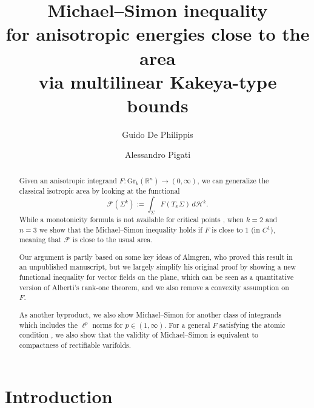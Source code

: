\documentclass[11pt,a4paper]{amsart}
\newcommand{\R}{\mathbb{R}}
\theoremstyle{definition}
\newcommand{\gr}{\text{Gr}_k(\R^n)}
\begin{document}
\title[Michael--Simon inequality for anisotropic energies]{Michael--Simon inequality \\ for anisotropic energies close to the area \\ via multilinear Kakeya-type bounds}
\author[G. De Philippis]{Guido De Philippis}
\address{Department of Mathematics, University of Padova, Via Trieste 63, 35121 Padova, Italy.}
\author[A. Pigati]{Alessandro Pigati}
\address{Department of Decision Sciences, Bocconi University, Via Roentgen 1, 20136 Milano, Italy.}


\begin{abstract}
Given an anisotropic integrand $F:\gr\to(0,\infty)$, we can generalize the classical isotropic area by looking at the functional
$$\mathcal{F}(\Sigma^k):=\int_\Sigma F(T_x\Sigma)\,d\mathcal{H}^k.$$
While a monotonicity formula is not available for critical points \cite{All.no.mono},
when $k=2$ and $n=3$ we show that the Michael--Simon inequality holds
if $F$ is close to $1$ (in $C^1$), meaning that $\mathcal{F}$ is close to the usual area.

Our argument is partly based on some key ideas of Almgren, who proved this
result in an unpublished manuscript, but we largely simplify his original proof
by showing a new functional inequality for vector fields on the plane,
which can be seen as a quantitative version of Alberti's rank-one theorem,
and we also remove a convexity assumption on $F$.

As another byproduct, we also show Michael--Simon for another class of integrands
which includes the $\ell^p$ norms for $p\in(1,\infty)$.
For a general $F$ satisfying the atomic condition \cite{DDG}, we also show that
the validity of Michael--Simon is equivalent to compactness of rectifiable varifolds.
\end{abstract}

\raggedbottom
\maketitle

\section{Introduction}
\end{document}
